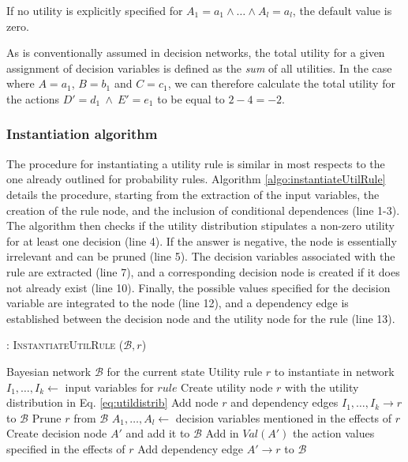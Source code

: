 If no utility is explicitly specified for $A_1\!=\!a_1 \land \dots \land A_l\!=\!a_l$, the default value is zero. 

As is conventionally assumed in decision networks, the total utility for a given assignment of decision variables is defined as the \textit{sum} of all utilities.  In the case where $A\!=\!a_1$, $B\!=\!b_1$ and $C\!=\!c_1$, we can therefore calculate the total utility for the actions $D'\!=\!d_1 \ \land \ E'\!=\!e_1$ to be equal to $2 - 4 = -2$. 


\subsubsection*{Instantiation algorithm} 

The procedure for instantiating a utility rule is similar in most respects to the one already outlined for probability rules. Algorithm \ref{algo:instantiateUtilRule} details the procedure, starting from the extraction of the input variables, the creation of the rule node, and the inclusion of conditional dependences (line 1-3). The algorithm then checks if the utility distribution stipulates a non-zero utility for at least one decision (line 4).  If the answer is negative, the node is essentially irrelevant and can be pruned (line 5).  The decision variables associated with the rule are extracted (line 7), and a corresponding decision node is created if it does not already exist (line 10). Finally, the possible values specified for the decision variable are integrated to the node (line 12), and a dependency edge is established between the decision node and the utility node for the rule (line 13). 

\begin{algorithm}[h!]
\caption{: \textsc{InstantiateUtilRule} ($\mathcal{B}, \mathit{r}$)}
\begin{algorithmic}[1] \vspace{1mm}
\REQUIRE Bayesian network $\mathcal{B}$ for the current state
\REQUIRE Utility rule $\mathit{r}$ to instantiate in network  \vspace{1mm}
\STATE $I_1, \dots, I_k \leftarrow $ input variables for $rule$
\STATE Create utility node $r$ with the utility distribution in Eq. \eqref{eq:utildistrib}
\STATE Add node $r$ and dependency edges $I_1, \dots, I_k \rightarrow r$ to $\mathcal{B}$ 
\STATE Prune $r$ from $\mathcal{B}$
\ELSE
\STATE $A_1, \dots, A_l \leftarrow$ decision variables mentioned in the effects of $r$
\STATE Create decision node $A'$ and add it to $\mathcal{B}$
\ENDIF
\STATE Add in $\textit{Val}(A')$ the action values specified in the effects of $r$
\STATE Add dependency edge $A' \rightarrow r$ to $\mathcal{B}$ 
\ENDFOR
\ENDIF
\end{algorithmic}
\label{algo:instantiateUtilRule}
\end{algorithm}


